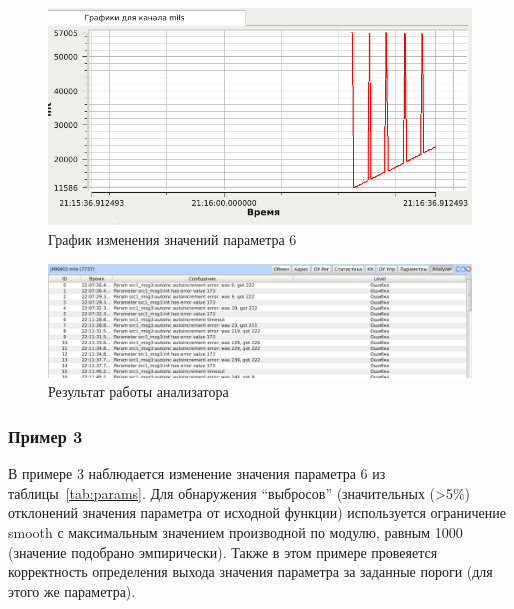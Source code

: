 \begin{figure}[H]
 \centering
 \includegraphics[scale=0.6]{tests/param_error_value/graph}
 \caption{График изменения значений параметра 6}
 \label{fig:param_error_value_graph}
\end{figure}

\begin{figure}[H]
 \centering
 \includegraphics[scale=0.4]{tests/param_error_value/report}
 \caption{Результат работы анализатора}
 \label{fig:param_error_value_report}
\end{figure}

\subsubsection{Пример 3}

В примере 3 наблюдается изменение значения параметра 6 из 
таблицы~\ref{tab:params}. Для обнаружения ``выбросов'' (значительных (>5\%)
отклонений значения параметра от исходной функции) используется ограничение 
smooth с максимальным значением производной по модулю, равным 1000 (значение 
подобрано эмпирически). Также в этом примере провеяется корректность 
определения выхода значения параметра за заданные пороги (для этого же 
параметра).



